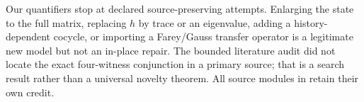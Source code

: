 Our quantifiers stop at declared source-preserving attempts.  Enlarging the
state to the full matrix, replacing $h$ by trace or an eigenvalue, adding a
history-dependent cocycle, or importing a Farey/Gauss transfer operator is a
legitimate new model but not an in-place repair.  The bounded literature
audit did not locate the exact four-witness conjunction in a primary source;
that is a search result rather than a universal novelty theorem.  All source
modules in  retain their own credit.
